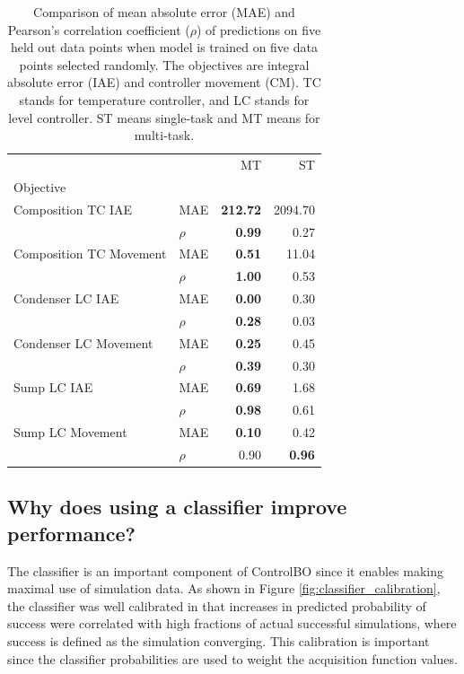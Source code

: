 \begin{table}[]
    \centering
    \caption{Comparison of mean absolute error (MAE) and Pearson's correlation coefficient ($\rho$) of predictions on five held out data points when model is trained on five data points selected randomly. The objectives are integral absolute error (IAE) and controller movement (CM). TC stands for temperature controller, and LC stands for level controller.  ST means single-task and MT means for multi-task.}
    \begin{tabular}{llrr}
    
    \toprule
                     &  &      MT &       ST \\
    Objective & {} &         &          \\
    \midrule
    Composition TC IAE & MAE&  \textbf{212.72} &  2094.70 \\
                     & $\rho$&    \textbf{0.99 }&     0.27 \\
    Composition TC Movement & MAE&    \textbf{0.51} &    11.04 \\
                     & $\rho$&    \textbf{1.00} &     0.53 \\
    Condenser LC IAE & MAE&    \textbf{0.00} &     0.30 \\
                     & $\rho$&    \textbf{0.28} &     0.03 \\
    Condenser LC Movement & MAE&    \textbf{0.25} &     0.45 \\
                     & $\rho$&    \textbf{0.39} &     0.30 \\
    Sump LC IAE & MAE&    \textbf{0.69} &     1.68 \\
                     & $\rho$&    \textbf{0.98} &     0.61 \\
    Sump LC Movement & MAE&    \textbf{0.10} &     0.42 \\
                     & $\rho$&    0.90 &    \textbf{ 0.96} \\
    \bottomrule
    \end{tabular}
    \label{tab:mt_vs_st_controlbo}
\end{table}


\subsection{Why does using a classifier improve performance?}

The classifier is an important component of ControlBO since it enables making maximal use of simulation data. As shown in Figure \ref{fig:classifier_calibration}, the classifier was well calibrated in that increases in predicted probability of success were correlated with high fractions of actual successful simulations, where success is defined as the simulation converging. This calibration is important since the classifier probabilities are used to weight the acquisition function values.

